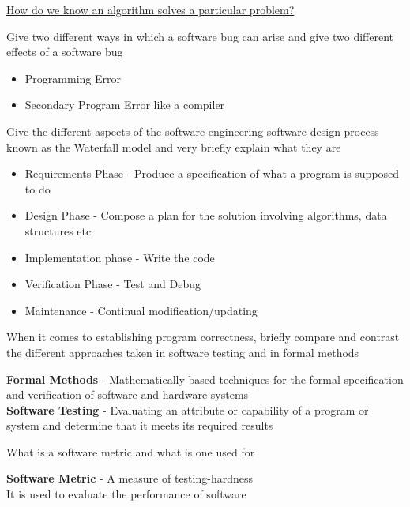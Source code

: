\documentclass[addpoints]{exam}
\begin{document}
\begin{center}
	\underline{\LARGE How do we know an algorithm solves a particular problem?}
\end{center}
\begin{questions}
\question[2]Give two different ways in which a software bug can arise and give two different effects of a software bug
\begin{solution}[2in]
\begin{itemize}
	\item Programming Error
	\item Secondary Program Error like a compiler
\end{itemize}
\end{solution}

\question[5]Give the different aspects of the software engineering software design process known as the Waterfall model and very briefly explain what they are
\begin{solution}[2in]
\begin{itemize}
	\item Requirements Phase - Produce a specification of what a program is supposed to do
	\item Design Phase - Compose a plan for the solution involving algorithms, data structures etc
	\item Implementation phase - Write the code
	\item Verification Phase - Test and Debug
	\item Maintenance - Continual modification/updating
\end{itemize}
\end{solution}

\question[2]When it comes to establishing program correctness, briefly compare and contrast the different approaches taken in software testing and in formal methods
\begin{solution}[2in]
\textbf{Formal Methods} - Mathematically based techniques for the formal specification and verification of software and hardware systems\\
\textbf{Software Testing} - Evaluating an attribute or capability of a program or system and determine that it meets its required results
\end{solution}

\question[2]What is a software metric and what is one used for
\begin{solution}[2in]
\textbf{Software Metric} - A measure of testing-hardness\\
It is used to evaluate the performance of software
\end{solution}


\end{questions}
\end{document}
